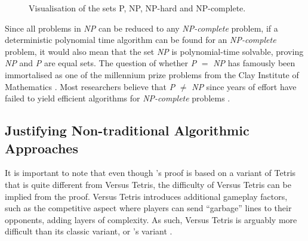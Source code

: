 \documentclass[a4paper, 12pt]{extreport}
\begin{document}
				\begin{figure}
					\centering
					\begin{adjustbox}{max width=\linewidth}
					\end{adjustbox}
					\caption{\centering Visualisation of the sets P, NP, NP-hard and NP-complete.}
					\label{fig:p,np,npcomplete}
				\end{figure}
				
				Since all problems in \textit{NP} can be reduced to any \textit{NP-complete} problem, if a deterministic polynomial time algorithm can be found for an \textit{NP-complete} problem, it would also mean that the set \textit{NP} is polynomial-time solvable, proving \textit{NP} and \textit{P} are equal sets. The question of whether \textit{P} $=$ \textit{NP} has famously been immortalised as one of the millennium prize problems from the Clay Institute of Mathematics \cite{claymathMillenniumPrize}. Most researchers believe that \textit{P} $\ne$ \textit{NP} since years of effort have failed to yield efficient algorithms for \textit{NP-complete} problems \cite{cc:modern}.
			
			\subsection{Justifying Non-traditional Algorithmic Approaches}
			
				
				It is important to note that even though \citeauthor{tetris-is-hard-even-to-approx}'s \cite{tetris-is-hard-even-to-approx} proof is based on a variant of Tetris that is quite different from Versus Tetris, the difficulty of Versus Tetris can be implied from the proof. Versus Tetris introduces additional gameplay factors, such as the competitive aspect where players can send ``garbage'' lines to their opponents, adding layers of complexity. As such, Versus Tetris is arguably more difficult than its classic variant, or  \citeauthor{tetris-is-hard-even-to-approx}'s variant \cite{tetris-is-hard-even-to-approx}.
				
\end{document}
